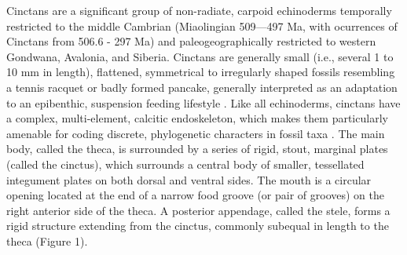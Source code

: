 \documentclass{article}
\begin{document}
Cinctans are a significant group of non-radiate, carpoid echinoderms temporally restricted to the middle Cambrian (Miaolingian 509—497 Ma, with ocurrences of Cinctans from 506.6 - 297 Ma) and paleogeographically restricted to western Gondwana, Avalonia, and Siberia. Cinctans are generally small (i.e., several 1 to 10 mm in length), flattened, symmetrical to irregularly shaped fossils resembling a tennis racquet or badly formed pancake, generally interpreted as an adaptation to an epibenthic, suspension feeding lifestyle \citep{Rahman2009a, RahmanEtAl2015}.  Like all echinoderms, cinctans have a complex, multi-element, calcitic endoskeleton, which makes them particularly amenable for coding discrete, phylogenetic characters in fossil taxa \citep{SmithZamora2009}. The main body, called the theca, is surrounded by a series of rigid, stout, marginal plates (called the cinctus), which surrounds a central body of smaller, tessellated integument plates on both dorsal and ventral sides. The mouth is a circular opening located at the end of a narrow food groove (or pair of grooves) on the right anterior side of the theca. A posterior appendage, called the stele, forms a rigid structure extending from the cinctus, commonly subequal in length to the theca (Figure 1).
\end{document}
